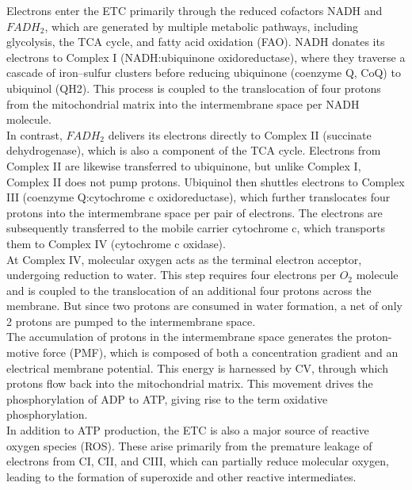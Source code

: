 Electrons enter the ETC primarily through the reduced cofactors NADH and $FADH_2$,  which are generated by multiple metabolic pathways, including glycolysis, the TCA cycle, and fatty acid oxidation (\gls{FAO}). NADH donates its electrons to Complex I (NADH:ubiquinone oxidoreductase), where they traverse a cascade of iron–sulfur clusters before reducing ubiquinone (coenzyme Q, CoQ) to ubiquinol (\gls{QH2}).
This process is coupled to the translocation of four protons from the mitochondrial matrix into the intermembrane space per NADH molecule. 
\\

In contrast, $FADH_2$ delivers its electrons directly to Complex II (succinate dehydrogenase), which is also a component of the TCA cycle. Electrons from Complex II are likewise transferred to ubiquinone, but unlike Complex I, Complex II does not pump protons. Ubiquinol then shuttles electrons to Complex III (coenzyme Q:cytochrome c oxidoreductase), which further translocates four protons into the intermembrane space per pair of electrons. The electrons are subsequently transferred to the mobile carrier cytochrome c, which transports them to Complex IV (cytochrome c oxidase).
\\

At Complex IV, molecular oxygen acts as the terminal electron acceptor, undergoing reduction to water. This step requires four electrons per $O_2$ molecule and is coupled to the translocation of an additional four protons across the membrane. But since two protons are consumed in water formation, a net of only 2 protons are pumped to the intermembrane space. 
\\

The accumulation of protons in the intermembrane space generates the proton-motive force (\gls{PMF}), which is composed of both a concentration gradient and an electrical membrane potential. This energy is harnessed by CV, through which protons flow back into the mitochondrial matrix. This movement drives the phosphorylation of ADP to ATP, giving rise to the term oxidative phosphorylation. 
\\

In addition to ATP production, the ETC is also a major source of reactive oxygen species (\gls{ROS}).
These arise primarily from the premature leakage of electrons from CI, CII, and CIII, which can partially reduce molecular oxygen, leading to the formation of superoxide and other reactive intermediates.
\\

